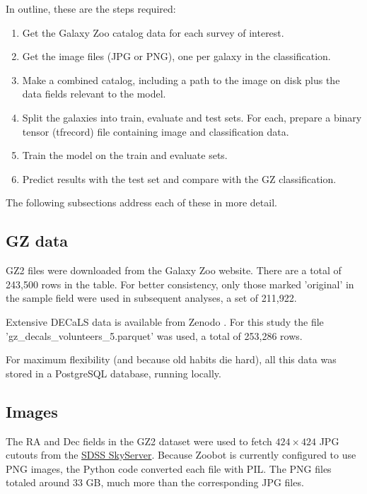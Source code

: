 \documentclass[twocolumn, twocolappendix, tighten]{aastex631}
\begin{document}
In outline, these are the steps required:

\begin{enumerate}
	\item Get the Galaxy Zoo catalog data for each survey of interest.
	\item Get the image files (JPG or PNG), one per galaxy in the classification.
	\item Make a combined catalog, including a path to the image on disk plus the data fields relevant to the model.
	\item Split the galaxies into train, evaluate and test sets. For each, prepare a binary tensor (tfrecord) file containing image and classification data.
	\item Train the model on the train and evaluate sets.
	\item Predict results with the test set and compare with the GZ classification.
\end{enumerate}

The following subsections address each of these in more detail.

\subsection{GZ data}

GZ2 files were downloaded from the Galaxy Zoo website.
There are a total of 243,500 rows in the table. For better consistency, only those marked 'original' in the sample field were used in subsequent analyses, a set of 211,922.

Extensive DECaLS data is available from Zenodo \citep{walmsley_mike_2020_4573248}. For this study the file 'gz\_decals\_volunteers\_5.parquet' was used, a total of 253,286 rows.

For maximum flexibility (and because old habits die hard), all this data was stored in a PostgreSQL database, running locally.

\subsection{Images} \label{images}

The RA and Dec fields in the GZ2 dataset were used to fetch $424 \times 424$ JPG cutouts from the \href{http://skyserver.sdss.org/dr14/SkyServerWS/ImgCutout/getjpeg}{SDSS SkyServer}. Because Zoobot is currently configured to use PNG images, the Python code converted each file with PIL. The PNG files totaled around 33 GB, much more than the corresponding JPG files.
\end{document}
